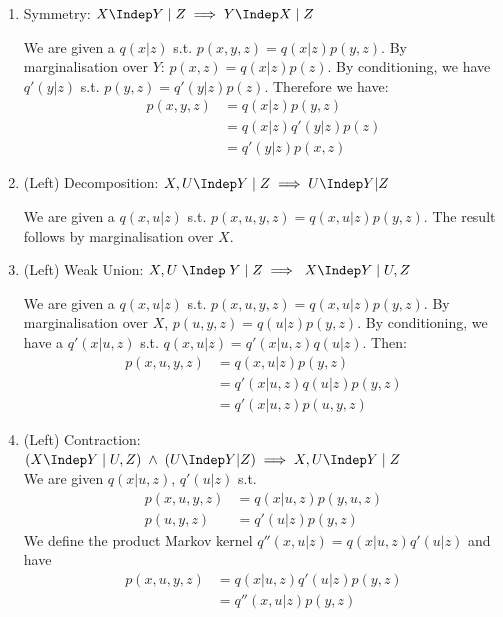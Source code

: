 \begin{enumerate}
\begin{gradedsolution}
\begin{enumerate}
    \begin{align*}
      p(x_1,y,x_2)&=\mathbbm{1}_{\{x_1\}}(x_2)p(y, x_2)\\
      q(x_1|x_2)&:=\mathbbm{1}_{\{x_1\}}(x_2)
    \end{align*}
    
    \item Symmetry: $X \Indep Y\; |\; Z \implies Y \Indep X\; |\; Z$ 
    
    We are given a $q(x|z)$ s.t. $p(x,y,z)=q(x|z)p(y,z)$. By marginalisation over $Y$: $p(x, z)=q(x|z)p(z)$. By conditioning, we have $q'(y|z)$ s.t. $p(y,z)=q'(y|z)p(z)$. Therefore we have:
    \begin{align*}
      p(x,y,z)
      &=q(x|z)p(y,z)\\
      &=q(x|z)q'(y|z)p(z)\\
      &=q'(y|z)p(x,z)
    \end{align*}

    \item (Left) Decomposition: $X, U \Indep Y \; | \; Z \implies U \Indep Y | Z\; $

    We are given a $q(x,u|z)$ s.t. $p(x, u, y, z)=q(x, u|z)p(y, z)$.
    The result follows by marginalisation over $X$.

    \item (Left) Weak Union: $X,U \;\Indep \;  Y \; | \; Z \implies  \; X \Indep Y \; |\; U,Z $

    We are given a $q(x,u|z)$ s.t. $p(x, u, y, z)=q(x, u|z)p(y, z)$. By marginalisation over $X$, $p(u, y, z)=q(u|z)p(y, z)$. By conditioning, we have a $q'(x|u,z)$ s.t. $q(x,u|z)=q'(x|u,z)q(u|z)$. Then:
    \begin{align*}
      p(x,u,y,z)
      &=q(x,u|z)p(y,z) \\
      &=q'(x|u,z)q(u|z)p(y,z) \\
      &=q'(x|u,z)p(u,y,z)
    \end{align*}

    \item (Left) Contraction: $(X \Indep Y\; |\; U, Z) \; \land \; (U \Indep Y | Z) \implies X, U \Indep Y \; | \; Z$ \\

    We are given $q(x|u,z)$, $q'(u|z)$ s.t.
    \begin{align*}
      p(x, u, y, z)&=q(x|u,z)p(y, u, z)\\
      p(u, y, z)&=q'(u|z)p(y, z)
    \end{align*}
    We define the product Markov kernel $q''(x,u|z)=q(x|u,z)q'(u|z)$ and have
    \begin{align*}
      p(x, u, y, z)&=q(x|u,z)q'(u|z)p(y, z)\\
      &=q''(x,u|z)p(y, z)
    \end{align*}


\end{enumerate}
\end{gradedsolution}
\end{enumerate}
